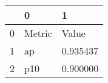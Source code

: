 \begin{tabular}{lll}
\toprule
 & 0 & 1 \\
\midrule
0 & Metric & Value \\
1 & ap & 0.935437 \\
2 & p10 & 0.900000 \\
\bottomrule
\end{tabular}
